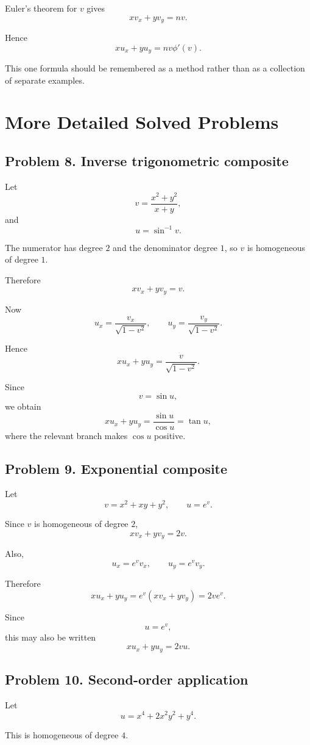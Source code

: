 \documentclass[11pt,oneside]{book}
\theoremstyle{studentthm}
\theoremstyle{definition}
\begin{document}
Euler's theorem for \(v\) gives
\[
xv_x+yv_y=nv.
\]

Hence
\[
xu_x+yu_y
=
nv\phi'(v).
\]

This one formula should be remembered as a method rather than as a
collection of separate examples.

\section{More Detailed Solved Problems}

\subsection*{Problem 8. Inverse trigonometric composite}

Let
\[
v=\frac{x^2+y^2}{x+y},
\]
and
\[
u=\sin^{-1}v.
\]

The numerator has degree \(2\) and the denominator degree \(1\), so
\(v\) is homogeneous of degree \(1\).

Therefore
\[
xv_x+yv_y=v.
\]

Now
\[
u_x
=
\frac{v_x}{\sqrt{1-v^2}},
\qquad
u_y
=
\frac{v_y}{\sqrt{1-v^2}}.
\]

Hence
\[
xu_x+yu_y
=
\frac{v}{\sqrt{1-v^2}}.
\]

Since
\[
v=\sin u,
\]
we obtain
\[
xu_x+yu_y
=
\frac{\sin u}{\cos u}
=
\tan u,
\]
where the relevant branch makes \(\cos u\) positive.

\subsection*{Problem 9. Exponential composite}

Let
\[
v=x^2+xy+y^2,
\qquad
u=e^v.
\]

Since \(v\) is homogeneous of degree \(2\),
\[
xv_x+yv_y=2v.
\]

Also,
\[
u_x=e^v v_x,
\qquad
u_y=e^v v_y.
\]

Therefore
\[
xu_x+yu_y
=
e^v(xv_x+yv_y)
=
2ve^v.
\]

Since
\[
u=e^v,
\]
this may also be written
\[
xu_x+yu_y=2vu.
\]

\subsection*{Problem 10. Second-order application}

Let
\[
u=x^4+2x^2y^2+y^4.
\]

This is homogeneous of degree \(4\).
\end{document}
